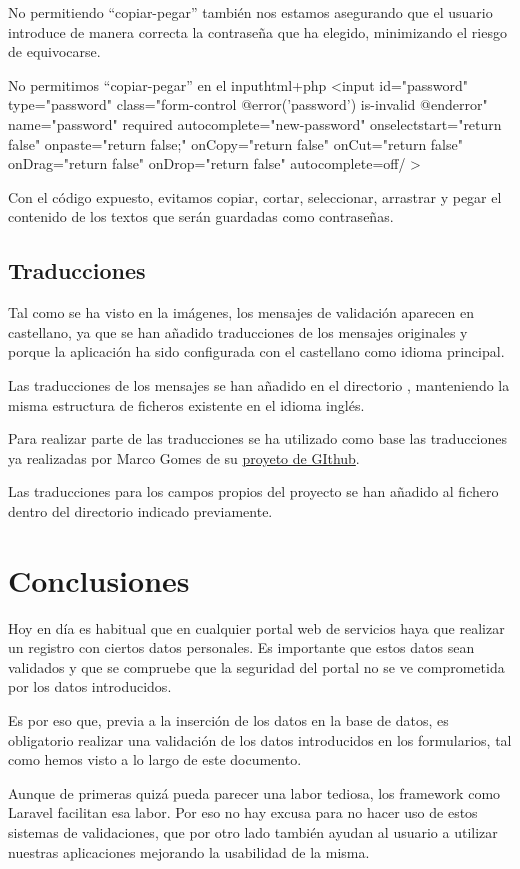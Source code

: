 \documentclass{\ClassPath/viu-tfm-template}
\begin{document}
No permitiendo “copiar-pegar” también nos estamos asegurando que el usuario introduce de manera correcta la contraseña que ha elegido, minimizando el riesgo de equivocarse.

\begin{mycode}{No permitimos “copiar-pegar” en el input}{html+php}{}
<input id="password" type="password" class="form-control
    @error('password') is-invalid @enderror"
    name="password" required autocomplete="new-password"
    onselectstart="return false"
    onpaste="return false;"
    onCopy="return false"
    onCut="return false"
    onDrag="return false"
    onDrop="return false"
    autocomplete=off/
>
\end{mycode}

Con el código expuesto, evitamos copiar, cortar, seleccionar, arrastrar y pegar el contenido de los textos que serán guardadas como contraseñas.

\section{Traducciones}
Tal como se ha visto en la imágenes, los mensajes de validación aparecen en castellano, ya que se han añadido traducciones de los mensajes originales y porque la aplicación ha sido configurada con el castellano como idioma principal.

Las traducciones de los mensajes se han añadido en el directorio , manteniendo la misma estructura de ficheros existente en el idioma inglés.

Para realizar parte de las traducciones se ha utilizado como base las traducciones ya realizadas por Marco Gomes de su \href{https://github.com/MarcoGomesr/laravel-validation-en-espanol}{proyeto de GIthub}.

Las traducciones para los campos propios del proyecto se han añadido al fichero  dentro del directorio indicado previamente.

\vfill
\pagebreak

\chapter{Conclusiones}
Hoy en día es habitual que en cualquier portal web de servicios haya que realizar un registro con ciertos datos personales. Es importante que estos datos sean validados y que se compruebe que la seguridad del portal no se ve comprometida por los datos introducidos.

Es por eso que, previa a la inserción de los datos en la base de datos, es obligatorio realizar una validación de los datos introducidos en los formularios, tal como hemos visto a lo largo de este documento.

Aunque de primeras quizá pueda parecer una labor tediosa, los framework como Laravel facilitan esa labor. Por eso no hay excusa para no hacer uso de estos sistemas de validaciones, que por otro lado también ayudan al usuario a utilizar nuestras aplicaciones mejorando la usabilidad de la misma.
\end{document}
